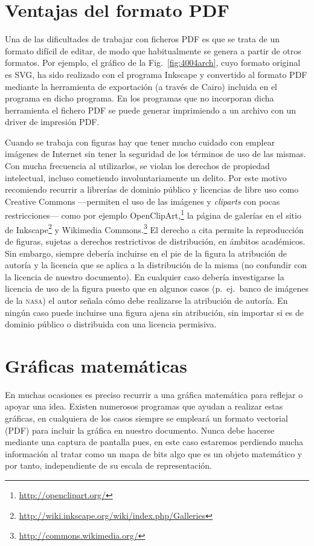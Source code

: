 \documentclass[ 		%
	11pt,				%
	a4paper,			%
	twoside,			%
	openright,			%
	final       		%
]{book}
\begin{document}
\section{Ventajas del formato \textsf{PDF}}
Una de las dificultades de trabajar con ficheros \textsf{PDF} es que se trata de un formato difícil de editar, de modo que habitualmente se genera a partir de otros formatos. Por ejemplo, el gráfico de la Fig.~\ref{fig:4004arch}, cuyo formato original es \textsf{SVG}, ha sido realizado con el programa \textsf{Inkscape} y convertido al formato \textsf{PDF} mediante la herramienta de exportación (a través de \textsf{Cairo}) incluida en el programa en dicho programa. En los programas que no incorporan dicha herramienta el fichero \textsf{PDF} se puede generar imprimiendo a un archivo con un driver de impresión \textsf{PDF}. 

Cuando se trabaja con figuras hay que tener mucho cuidado con emplear imágenes de Internet sin tener la seguridad de los términos de uso de las mismas. Con mucha frecuencia al utilizarlos, se violan los derechos de propiedad intelectual, incluso cometiendo involuntariamente un delito. Por este motivo recomiendo recurrir a librerías de dominio público y licencias de libre uso como Creative Commons ---permiten el uso de las imágenes y \emph{cliparts} con pocas restricciones--- como por ejemplo OpenClipArt,\footnote{\url{http://openclipart.org/}} la página de galerías en el sitio de Inkscape\footnote{\url{http://wiki.inkscape.org/wiki/index.php/Galleries}} y Wikimedia Commons.\footnote{\url{http://commons.wikimedia.org/}} El derecho a cita permite la reproducción de figuras, sujetas a derechos restrictivos de distribución, en ámbitos académicos. Sin embargo, siempre debería incluirse en el pie de la figura la atribución de autoría y la licencia que se aplica a la distribución de la misma (no confundir con la licencia de nuestro documento). En cualquier caso debería investigarse la licencia de uso de la figura puesto que en algunos casos (p.~ej.\ banco de imágenes de la \textsc{nasa}) el autor señala cómo debe realizarse la atribución de autoría. En ningún caso puede incluirse una figura ajena sin atribución, sin importar si es de dominio público o distribuida con una licencia permisiva.


\section{Gráficas matemáticas}
En muchas ocasiones es preciso recurrir a una gráfica matemática para reflejar o apoyar una idea. Existen numerosos programas que ayudan a realizar estas gráficas, en cualquiera de los casos siempre se empleará un formato vectorial (\textsf{PDF}) para incluir la gráfica en nuestro documento. Nunca debe hacerse mediante una captura de pantalla pues, en este caso estaremos perdiendo mucha información al tratar como un mapa de bits algo que es un objeto matemático y por tanto, independiente de su escala de representación.
\end{document}
